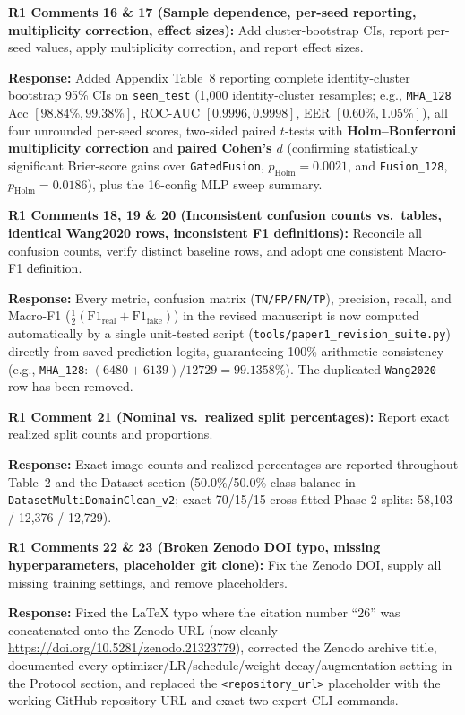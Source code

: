 \documentclass[11pt,a4paper]{article}
\newcommand{\reviewercomment}[2]{%
  \vspace{0.6em}\noindent\begin{tcolorbox}[colback=boxbg,colframe=revcolor,boxrule=0.6pt,left=6pt,right=6pt,top=4pt,bottom=4pt]
  \textbf{\color{revcolor}#1:} #2
  \end{tcolorbox}
}
\newcommand{\authorresponse}[1]{%
  \noindent\textbf{\color{respcolor}Response:} #1\par\vspace{0.5em}
}
\begin{document}
\reviewercomment{R1 Comments 16 \& 17 (Sample dependence, per-seed reporting, multiplicity correction, effect sizes)}{Add cluster-bootstrap CIs, report per-seed values, apply multiplicity correction, and report effect sizes.}
\authorresponse{Added Appendix Table~8 reporting complete identity-cluster bootstrap 95\% CIs on \texttt{seen\_test} (1,000 identity-cluster resamples; e.g., \texttt{MHA\_128} Acc $[98.84\%, 99.38\%]$, ROC-AUC $[0.9996,0.9998]$, EER $[0.60\%,1.05\%]$), all four unrounded per-seed scores, two-sided paired $t$-tests with \textbf{Holm--Bonferroni multiplicity correction} and \textbf{paired Cohen's $d$} (confirming statistically significant Brier-score gains over \texttt{GatedFusion}, $p_{\text{Holm}}=0.0021$, and \texttt{Fusion\_128}, $p_{\text{Holm}}=0.0186$), plus the 16-config MLP sweep summary.}

\reviewercomment{R1 Comments 18, 19 \& 20 (Inconsistent confusion counts vs.\ tables, identical Wang2020 rows, inconsistent F1 definitions)}{Reconcile all confusion counts, verify distinct baseline rows, and adopt one consistent Macro-F1 definition.}
\authorresponse{Every metric, confusion matrix (\texttt{TN/FP/FN/TP}), precision, recall, and Macro-F1 ($\frac{1}{2}(\text{F1}_{\text{real}}+\text{F1}_{\text{fake}})$) in the revised manuscript is now computed automatically by a single unit-tested script (\texttt{tools/paper1\_revision\_suite.py}) directly from saved prediction logits, guaranteeing 100\% arithmetic consistency (e.g., \texttt{MHA\_128}: $(6480+6139)/12729=99.1358\%$). The duplicated \texttt{Wang2020} row has been removed.}

\reviewercomment{R1 Comment 21 (Nominal vs.\ realized split percentages)}{Report exact realized split counts and proportions.}
\authorresponse{Exact image counts and realized percentages are reported throughout Table~2 and the Dataset section (50.0\%/50.0\% class balance in \texttt{DatasetMultiDomainClean\_v2}; exact 70/15/15 cross-fitted Phase 2 splits: 58,103 / 12,376 / 12,729).}

\reviewercomment{R1 Comments 22 \& 23 (Broken Zenodo DOI typo, missing hyperparameters, placeholder git clone)}{Fix the Zenodo DOI, supply all missing training settings, and remove placeholders.}
\authorresponse{Fixed the LaTeX typo where the citation number ``26'' was concatenated onto the Zenodo URL (now cleanly \url{https://doi.org/10.5281/zenodo.21323779}), corrected the Zenodo archive title, documented every optimizer/LR/schedule/weight-decay/augmentation setting in the Protocol section, and replaced the \texttt{<repository\_url>} placeholder with the working GitHub repository URL and exact two-expert CLI commands.}
\end{document}
